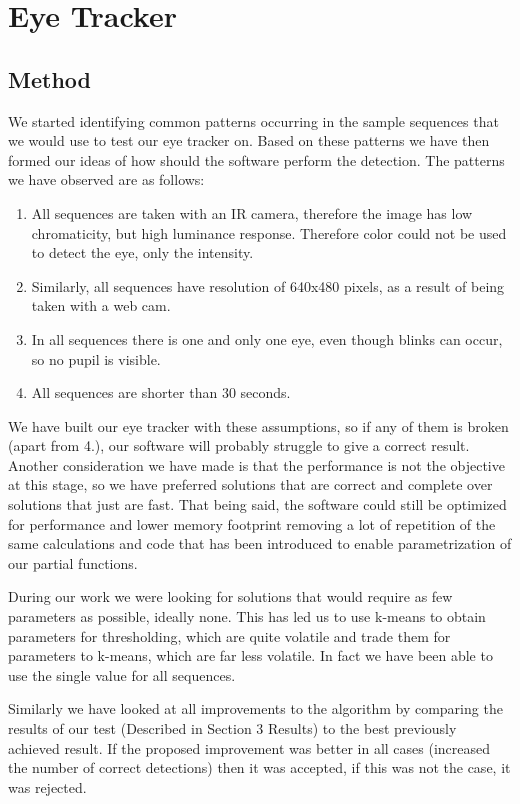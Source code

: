 \section{Eye Tracker}
\subsection{Method}

We started identifying common patterns occurring in the sample sequences that we would use to test our eye tracker on. Based on these patterns we have then formed our ideas of how should the software perform the detection. The patterns we have observed are as follows:

\begin{enumerate}

\item All sequences are taken with an IR camera, therefore the image has low chromaticity, but high luminance response. Therefore color could not be used to detect the eye, only the intensity.
\item Similarly, all sequences have resolution of 640x480 pixels, as a result of being taken with a web cam.
\item In all sequences there is one and only one eye, even though blinks can occur, so no pupil is visible.
\item All sequences are shorter than 30 seconds.

\end{enumerate}

We have built our eye tracker with these assumptions, so if any of them is broken (apart from 4.), our software will probably struggle to give a correct result. Another consideration we have made is that the performance is not the objective at this stage, so we have preferred solutions that are correct and complete over solutions that just are fast. That being said, the software could still be optimized for performance and lower memory footprint removing a lot of repetition of the same calculations and code that has been introduced to enable parametrization of our partial functions.

During our work we were looking for solutions that would require as few parameters as possible, ideally none. This has led us to use k-means to obtain parameters for thresholding, which are quite volatile and trade them for parameters to k-means, which are far less volatile. In fact we have been able to use the single value for all sequences.

Similarly we have looked at all improvements to the algorithm by comparing the results of our test (Described in Section 3 Results) to the best previously achieved result. If the proposed improvement was better in all cases (increased the number of correct detections) then it was accepted, if this was not the case, it was rejected.


